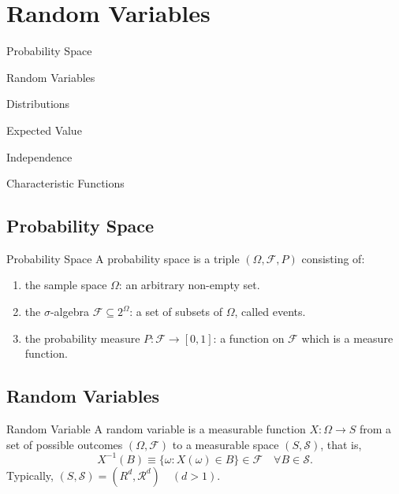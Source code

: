 \chapter{Random Variables}

\begin{introduction}
    \item Probability Space
    \item Random Variables
    \item Distributions
    \item Expected Value
    \item Independence
    \item Characteristic Functions
\end{introduction}

\section{Probability Space}

\begin{definition}{Probability Space}{}
    A probability space is a triple $(\Omega,\mathcal{F},P)$ consisting of:
    \begin{enumerate}
        \item the sample space $\Omega$: an arbitrary non-empty set.
        \item the $\sigma$-algebra $\mathcal{F}\subseteq 2^{\Omega}$: a set of subsets of $\Omega$, called events.
        \item the probability measure $P:\mathcal{F} \rightarrow[0,1]$: a function on $\mathcal{F}$ which is a measure function.
    \end{enumerate}
\end{definition}

\section{Random Variables}

\begin{definition}{Random Variable}{}
    A random variable is a measurable function $X:\Omega\rightarrow S$ from a set of possible outcomes $(\Omega,\mathcal{F})$ to a measurable space $(S,\mathcal{S})$, that is,
    \begin{equation}
        X^{-1}(B)\equiv\{\omega:X(\omega)\in B\}\in\mathcal{F}\quad \forall B\in\mathcal{S}.
    \end{equation}
    Typically, $(S,\mathcal{S})=(R^d,\mathcal{R}^d)\quad(d>1)$.
\end{definition}


